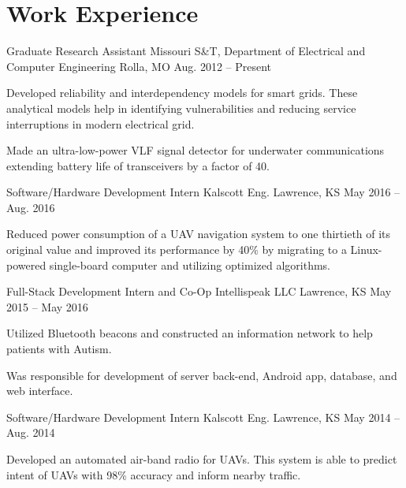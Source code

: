 \section{Work Experience}
\begin{cventries}
  \cventry
    {Graduate Research Assistant}
    {Missouri S\&T, Department of Electrical and Computer Engineering}
    {Rolla, MO}
    {Aug. 2012 -- Present}
    {
      \begin{cvitems}
        \item Developed reliability and interdependency models for smart grids. These analytical models help in identifying vulnerabilities and reducing service interruptions in modern electrical grid.
        \item Made an ultra-low-power VLF signal detector for underwater communications extending battery life of transceivers by a factor of 40.
      \end{cvitems}
    }
  \cventry
    {Software/Hardware Development Intern}
    {Kalscott Eng.}
    {Lawrence, KS}
    {May 2016 -- Aug. 2016}
    {
      \begin{cvitems}
        \item Reduced power consumption of a UAV navigation system to one thirtieth of its original value and improved its performance by 40\% by migrating to a Linux-powered single-board computer and utilizing optimized algorithms.
      \end{cvitems}
    }
  \cventry
    {Full-Stack Development Intern and Co-Op}
    {Intellispeak LLC}
    {Lawrence, KS}
    {May 2015 -- May 2016}
    {
      \begin{cvitems}
        \item Utilized Bluetooth beacons and constructed an information network to help patients with Autism.
        \item Was responsible for development of server back-end, Android app, database, and web interface.
      \end{cvitems}
    }
  \cventry
    {Software/Hardware Development Intern}
    {Kalscott Eng.}
    {Lawrence, KS}
    {May 2014 -- Aug. 2014}
    {
      \begin{cvitems}
        \item Developed an automated air-band radio for UAVs. This system is able to predict intent of UAVs with 98\% accuracy and inform nearby traffic.

\end{cvitems}}
\end{cventries}
